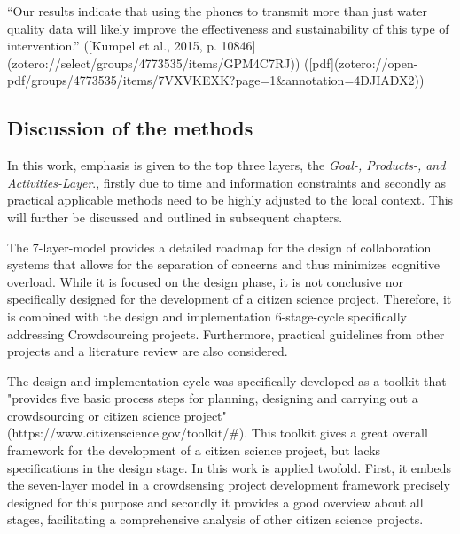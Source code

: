 “Our results indicate that using the phones to transmit more than just water quality data will likely improve the effectiveness and sustainability of this type of intervention.” ([Kumpel et al., 2015, p. 10846](zotero://select/groups/4773535/items/GPM4C7RJ)) ([pdf](zotero://open-pdf/groups/4773535/items/7VXVKEXK?page=1&annotation=4DJIADX2))




\subsection{Discussion of the methods}

In this work, emphasis is given to the top three layers, the \textit{Goal-, Products-, and Activities-Layer}., firstly due to time and information constraints and secondly as practical applicable methods need to be highly adjusted to the local context. This will further be discussed and outlined in subsequent chapters.


The 7-layer-model provides a detailed roadmap for the design of collaboration systems that allows for the separation of concerns and thus minimizes cognitive overload. While it is focused on the design phase, it is not conclusive nor specifically designed for the development of a citizen science project. Therefore, it is combined with the design and implementation 6-stage-cycle specifically addressing Crowdsourcing projects. Furthermore, practical guidelines from other projects and a literature review are also considered.

The design and implementation cycle was specifically developed as a toolkit that "provides five basic process steps for planning, designing and carrying out a crowdsourcing or citizen science project" (https://www.citizenscience.gov/toolkit/#). This toolkit gives a great overall framework for the development of a citizen science project, but lacks specifications in the design stage. In this work is applied twofold. First, it embeds the seven-layer model in a crowdsensing project development framework precisely designed for this purpose and secondly it provides a good overview about all stages, facilitating a comprehensive analysis of other citizen science projects. 


